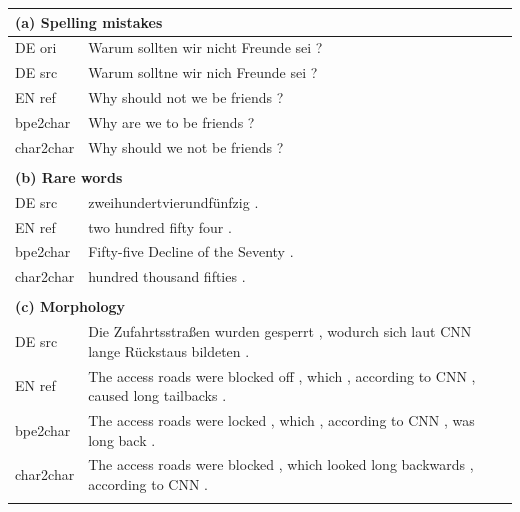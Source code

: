 \documentclass[11pt,letterpaper]{article}
\newcommand{\tb}{\textbf}
\newcommand{\clr}{\color{Red}}
\begin{document}
    \begin{table}[h!]
    \footnotesize
    \centering

    \begin{tabular}{p{1.4cm}|p{14.2cm}}
    \multicolumn{2}{l}{\tb{(a) Spelling mistakes}} \\ \hline \hline
    DE ori  & Warum sollt{\clr en} wir nich{\clr t} Freunde sei ? \\ \hline
    DE src  & Warum sollt{\clr ne} wir nich Freunde sei ? \\ \hline
    EN ref  & Why {\clr should not we be} friends ? \\ \hline
    bpe2char &  Why {\clr are we to be} friends ?\\ \hline
    char2char & Why {\clr should we not be} friends ? \\ \hline
    \multicolumn{2}{l}{}       \\

    \multicolumn{2}{l}{\tb{(b) Rare words}} \\ \hline \hline
    DE src  & \vspace{-0.80em}{\clr Siebentausend}zweihundertvierundf\"unfzig . \\ \hline
    EN ref  & \vspace{-0.80em}{\clr Seven thousand} two hundred fifty four . \\ \hline
    bpe2char &  Fifty-five {\clr Decline of the Seventy} . \\ \hline
    char2char & \vspace{-0.80em}{\clr Seven thousand} hundred thousand fifties . \\ \hline
    \multicolumn{2}{l}{}       \\

    \multicolumn{2}{l}{\tb{(c) Morphology}} \\ \hline \hline
    DE src  & Die Zufahrtsstraßen wurden {\clr gesperrt} , wodurch sich laut CNN lange R\"uckstaus bildeten . \\ \hline
    EN ref  & The access roads were {\clr blocked off} , which , according to CNN , caused long tailbacks . \\ \hline
    bpe2char &  The access roads were {\clr locked} , which , according to CNN , was long back . \\ \hline
    char2char & The access roads were {\clr blocked} , which looked long backwards , according to CNN . \\ \hline
    \multicolumn{2}{l}{}       \\


\end{tabular}
\end{table}
\end{document}
